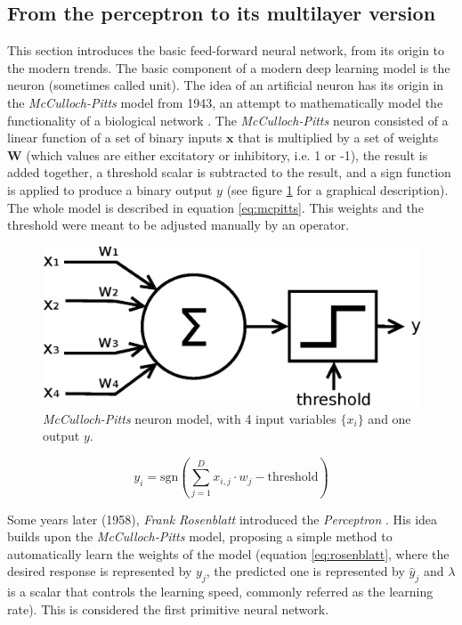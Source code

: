 \subsection{From the perceptron to its multilayer version} \label{sec:mlp}

This section introduces the basic feed-forward neural network, from its origin to the modern trends. The basic component of a modern deep learning model is the neuron (sometimes called unit). The idea of an artificial neuron has its origin in the \textit{McCulloch-Pitts} model from 1943, an attempt to mathematically model the functionality of a biological network \autocite{mccullochPitts1943}. The \textit{McCulloch-Pitts} neuron consisted of a linear function of a set of binary inputs $\mathbf{x}$ that is multiplied by a set of weights $\mathbf{W}$ (which values are either excitatory or inhibitory, i.e. 1 or -1), the result is added together, a threshold scalar is subtracted to the result, and a sign function is applied to produce a binary output $y$ (see figure \ref{fig:mcpittsneuron} for a graphical description). The whole model is described in equation \ref{eq:mcpitts}. This weights and the threshold were meant to be adjusted manually by an operator.

\begin{figure}
	\centering
	\includegraphics[width=0.60\linewidth]{chapter2/images/mcpittsneuron}
	\caption{\textit{McCulloch-Pitts} neuron model, with 4 input variables $\{x_i\}$ and one output $y$.}
	\label{fig:mcpittsneuron}
\end{figure}

\begin{equation}
	\label{eq:mcpitts}
	y_i = \mathrm{sgn}\left(\sum_{j=1}^{D} x_{i,j} \cdot w_{j} - \mathrm{threshold}\right)
\end{equation}

Some years later (1958), \textit{Frank Rosenblatt} introduced the \textit{Perceptron} \autocite{Rosenblatt58}. His idea builds upon the \textit{McCulloch-Pitts} model, proposing a simple method to automatically learn the weights of the model (equation \ref{eq:rosenblatt}, where the desired response is represented by $y_j$, the predicted one is represented by $\hat{y}_j$ and $\lambda$ is a scalar that controls the learning speed, commonly referred as the learning rate). This is considered the first primitive neural network.

